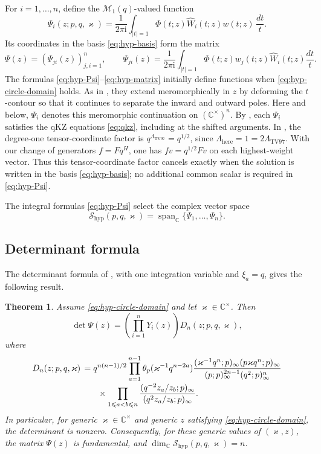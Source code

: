 \documentclass[12pt]{amsart}
\newtheorem{thm}{Theorem}[section]
\theoremstyle{definition}
\numberwithin{equation}{section}
\theoremstyle{definition}
\let\mc\mathcal
\let\La\Lambda
\let\tht\theta
\let\le\leqslant
\def\C{{\mathbb C}}
\def\beq{\begin{equation}}
\def\eeq{\end{equation}}
\begin{document}
For $i=1,\ldots,n$, define the $\mc M_1(q)$-valued function
\beq\label{eq:hyp-Psi}
 \boxed{\quad
 \Psi_i(z;p,q,\varkappa)=\frac{1}{2\pi\mathrm{i}}
 \int_{|t|=1}\Phi(t;z)\widehat W_i(t;z)
 w(t;z)\,\frac{dt}{t}.
 \quad}
\eeq
Its coordinates in the basis \eqref{eq:hyp-basis} form the matrix
\beq\label{eq:hyp-matrix}
 \Psi(z)=(\Psi_{ji}(z))_{j,i=1}^n,\qquad
 \Psi_{ji}(z)=\frac{1}{2\pi\mathrm{i}}\int_{|t|=1}
 \Phi(t;z)w_j(t;z)\widehat W_i(t;z)\frac{dt}{t}.
\eeq
The formulas \eqref{eq:hyp-Psi}--\eqref{eq:hyp-matrix} initially
define functions when \eqref{eq:hyp-circle-domain} holds.  As in
\cite[Section~5]{TV97}, they extend meromorphically in $z$ by
deforming the $t$-contour so that it continues to separate the
inward and outward poles.  Here and below, $\Psi_i$ denotes this
meromorphic continuation on $(\C^\times)^n$.
By \cite[Corollary~5.19]{TV97}, each $\Psi_i$ satisfies the
qKZ equations \eqref{eq:qkz}, including at the shifted arguments.
In \cite[(4.1)]{TV97}, the degree-one tensor-coordinate factor is
$q^{\La_{\mathrm{TV97}}}=q^{1/2}$, since
$\La_{\mathrm{here}}=1=2\La_{\mathrm{TV97}}$.
With our change of generators $f=Fq^H$, one has
$fv=q^{1/2}Fv$ on each highest-weight vector.
Thus this tensor-coordinate factor cancels exactly when the
solution is written in the basis \eqref{eq:hyp-basis}; no additional
common scalar is required in \eqref{eq:hyp-Psi}.

The integral formulas \eqref{eq:hyp-Psi} select the complex vector space
\beq\label{eq:hyp-S}
 \mc S_{\mathrm{hyp}}(p,q,\varkappa)
 =\operatorname{span}_{\C}\{\Psi_1,\ldots,\Psi_n\}.
\eeq

\subsection{Determinant formula}

The determinant formula of \cite[Theorem~5.9]{TV97}, with one
integration variable and $\xi_a=q$, gives the following result.

\begin{thm}\label{thm:hyp-det}
Assume \eqref{eq:hyp-circle-domain} and let $\varkappa\in\C^\times$.
Then
\beq\label{eq:hyp-det}
 \det\Psi(z)
 =\left(\prod_{i=1}^nY_i(z)\right)
   D_n(z;p,q,\varkappa),
\eeq
where
\begin{align}
 \label{eq:hyp-Dn}
 D_n(z;p,q,\varkappa)
 &\,=q^{n(n-1)/2}
 \prod_{a=1}^{n-1}\tht_p(\varkappa^{-1}q^{n-2a})
 \frac{(\varkappa^{-1}q^n;p)_\infty
       (p\varkappa q^n;p)_\infty}
      {(p;p)_\infty^{2n-1}(q^2;p)_\infty^n}
 \\[-2pt]
 &\qquad\times
 \prod_{1\le a<b\le n}
 \frac{(q^{-2}z_a/z_b;p)_\infty}
      {(q^{2}z_a/z_b;p)_\infty}.\notag
\end{align}
In particular, for generic $\varkappa\in\C^\times$ and generic
$z$ satisfying \eqref{eq:hyp-circle-domain}, the determinant is
nonzero.  Consequently, for these generic values of
$(\varkappa,z)$, the matrix $\Psi(z)$ is fundamental, and
$\dim_\C\mc S_{\mathrm{hyp}}(p,q,\varkappa)=n$.
\end{thm}
\end{document}
